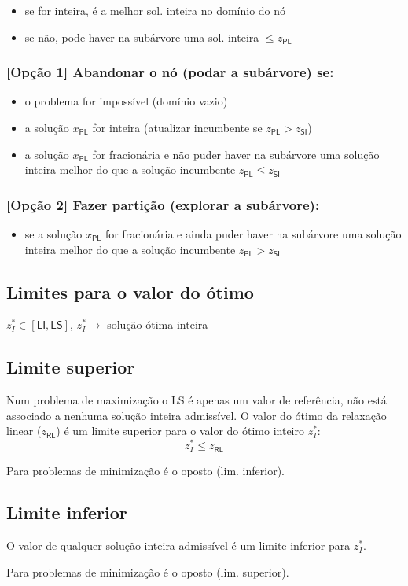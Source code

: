 \documentclass[10pt, a4paper]{article}
\begin{document}
\begin{multicols}{2}
\begin{itemize}
    \item se for inteira, é a melhor sol. inteira no domínio do nó
    \item se não, pode haver na subárvore uma sol. inteira \(\le z_\textsf{PL}\)
\end{itemize}

\subsubsection{[Opção 1] Abandonar o nó (podar a subárvore) se:}

\begin{itemize}
    \item o problema for impossível (domínio vazio)
    \item a solução \(x_\textsf{PL}\) for inteira (atualizar incumbente se \(z_\textsf{PL} > z_\textsf{SI}\))
    \item a solução \(x_\textsf{PL}\) for fracionária e não puder haver na subárvore uma solução inteira melhor do que a solução incumbente \(z_\textsf{PL} \le z_\textsf{SI}\)
\end{itemize}

\subsubsection{[Opção 2] Fazer partição (explorar a subárvore):}

\begin{itemize}
    \item se a solução \(x_\textsf{PL}\) for fracionária e ainda puder haver na subárvore uma solução inteira melhor do que a solução incumbente \(z_\textsf{PL} > z_\textsf{SI}\)
\end{itemize}

\subsection{Limites para o valor do ótimo}

\(z_I^* \in [\textsf{LI}, \textsf{LS}]\), \(z_I^* \rightarrow\) solução ótima inteira

\subsection{Limite superior}

Num problema de maximização o LS é apenas um valor de referência, não está associado a nenhuma solução inteira admissível. O valor do ótimo da relaxação linear (\(z_\textsf{RL}\)) é um limite superior para o valor do ótimo inteiro \(z_I^*\):
\[z_I^* \le z_\textsf{RL}\]

\vspace{0.25cm}

Para problemas de minimização é o oposto (lim. inferior).

\subsection{Limite inferior}

O valor de qualquer solução inteira admissível é um limite inferior para \(z_I^*\). 

Para problemas de minimização é o oposto (lim. superior).

\end{multicols}
\end{document}
